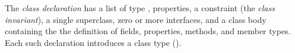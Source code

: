The {\em class declaration} has a list of type \params, properties, a
constraint (the {\em class invariant}), a single superclass, zero or more
interfaces, and a class body containing the the definition of fields,
properties, methods, and member types. Each such declaration introduces a
class type ().


 





